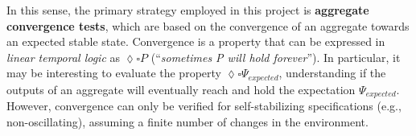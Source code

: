 In this sense, the primary strategy employed in this project is
\textbf{aggregate convergence tests}, which are based on the convergence of an
aggregate towards an expected stable state. Convergence is a property that can
be expressed in \textit{linear temporal logic} as $\lozenge \square P$
(\enquote{\textit{sometimes P will hold forever}}). In particular, it may be
interesting to evaluate the property $\lozenge \square \Psi_{expected}$,
understanding if the outputs of an aggregate will eventually reach and hold the
expectation $\Psi_{expected}$. However, convergence can only be verified for
self-stabilizing specifications (e.g., non-oscillating), assuming a finite
number of changes in the environment.
